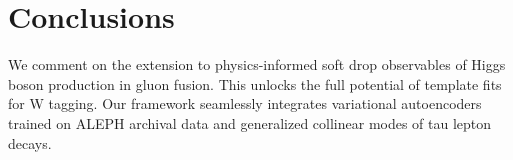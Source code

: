 \section{Conclusions}\label{sec:conclusions}

We comment on the extension to physics-informed soft drop observables of
Higgs boson production in gluon fusion. This unlocks the full potential
of template fits for W tagging. Our framework seamlessly integrates
variational autoencoders trained on ALEPH archival data and generalized
collinear modes of tau lepton decays.

